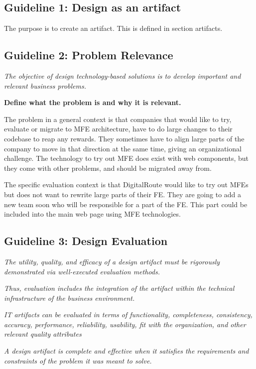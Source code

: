 \subsection{Guideline 1: Design as an artifact}
The purpose is to create an artifact. This is defined in section artifacts.

\subsection{Guideline 2: Problem Relevance}
\textit{The objective of design technology-based solutions is to develop important and relevant business problems.}

\textbf{Define what the problem is and why it is relevant.}

The problem in a general context is that companies that would like to try, evaluate or migrate to \ac{MFE} architecture, have to do large changes to their codebase to reap any rewards. They sometimes have to align large parts of the company to move in that direction at the same time, giving an organizational challenge. The technology to try out \ac{MFE} does exist with web components, but they come with other problems, and should be migrated away from.

The specific evaluation context is that DigitalRoute would like to try out \acp{MFE} but does not want to rewrite large parts of their \ac{FE}. They are going to add a new team soon who will be responsible for a part of the \ac{FE}. This part could be included into the main web page using \ac{MFE} technologies.

\subsection{Guideline 3: Design Evaluation}
\textit{The utility, quality, and efficacy of a design artifact must be rigorously demonstrated via well-executed evaluation methods.}

\textit{Thus, evaluation includes the integration of the artifact within the technical infrastructure of the business environment.}

\textit{IT artifacts can be evaluated in terms of functionality, completeness, consistency, accuracy, performance, reliability, usability, fit with the organization, and other relevant quality attributes}

\textit{A design artifact is complete and effective when it satisfies the requirements and constraints of the problem it was meant to solve.}

